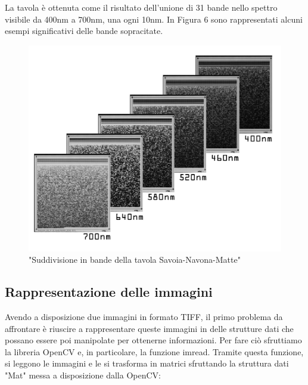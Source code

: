 \documentclass[a4paper,11pt]{article}
\begin{document}
    La tavola è ottenuta come il risultato dell'unione di 31 bande nello spettro visibile da 400nm a 700nm, una ogni 10nm.
    In Figura 6 sono rappresentati alcuni esempi significativi delle bande sopracitate.
    \begin{figure}[h]
        \centering
        \includegraphics[scale=0.15]{tavola2}
        \caption{"Suddivisione in bande della tavola Savoia-Navona-Matte"}
    \end{figure}
    \newpage
    \subsection{Rappresentazione delle immagini}
    Avendo a disposizione due immagini in formato TIFF, il primo problema da affrontare è riuscire a rappresentare queste immagini in delle strutture dati che possano essere poi manipolate per ottenerne informazioni.
    Per fare ciò sfruttiamo la libreria OpenCV e, in particolare, la funzione imread. Tramite questa funzione, si leggono le immagini e le si trasforma in matrici sfruttando la struttura dati "Mat" messa a disposizione dalla OpenCV:
 
\end{document}

